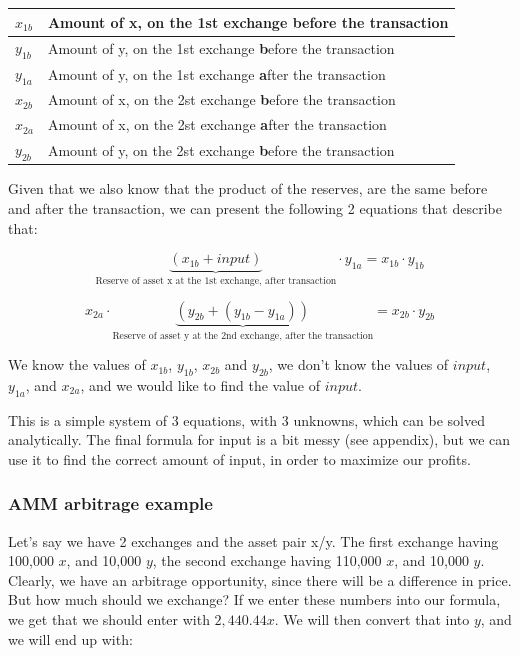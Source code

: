 \begin{table}[h]
\centering
\begin{tabular}{|l|l|}
\hline
$x_{1b}$ & Amount of x, on the 1st exchange \textbf{b}efore the transaction \\
\hline
$y_{1b}$ & Amount of y, on the 1st exchange \textbf{b}efore the transaction \\
\hline
$y_{1a}$ & Amount of y, on the 1st exchange \textbf{a}fter the transaction \\
\hline
$x_{2b}$ & Amount of x, on the 2st exchange \textbf{b}efore the transaction \\
\hline
$x_{2a}$ & Amount of x, on the 2st exchange \textbf{a}fter the transaction \\
\hline
$y_{2b}$ & Amount of y, on the 2st exchange \textbf{b}efore the transaction \\
\hline
\end{tabular}
\end{table}

Given that we also know that the product of the reserves, are the same before and
after the transaction, we can present the following 2 equations that describe
that:

\begin{equation}
\underbrace{(x_{1b} + input)}_{\text{Reserve of asset x at the 1st exchange, after transaction}} \cdot y_{1a} = x_{1b} \cdot y_{1b}
\end{equation}

\begin{equation}
x_{2a} \cdot \underbrace{(y_{2b} + (y_{1b} - y_{1a}))}_{\text{Reserve of asset y at
the 2nd exchange, after the transaction}} = x_{2b} \cdot y_{2b}
\end{equation}

We know the values of $x_{1b}$, $y_{1b}$, $x_{2b}$ and $y_{2b}$, we don't know
the values of $input$, $y_{1a}$, and $x_{2a}$, and we would like to find the
value of $input$.

This is a simple system of 3 equations, with 3 unknowns, which can be solved
analytically. The final formula for input is a bit messy (see appendix), but we
can use it to find the correct amount of input, in order to maximize our
profits.

\subsubsection{AMM arbitrage example}
Let's say we have 2 exchanges and the asset pair x/y. The first exchange having
100,000 $x$, and 10,000 $y$, the second exchange having 110,000 $x$, and 10,000 $y$.
Clearly, we have an arbitrage opportunity, since there will be a difference in
price. But how much should we exchange? If we enter these numbers into our
formula, we get that we should enter with $2,440.44 x$. We will then convert that
into $y$, and we will end up with:

